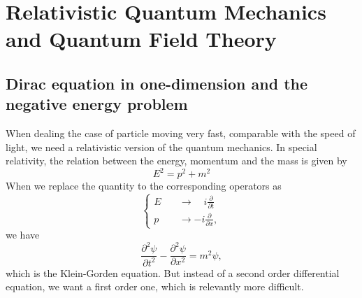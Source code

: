 \documentclass{article}
\newcommand{\be}{\begin{equation}}
\newcommand{\ee}{\end{equation}}
\newcommand{\p}{\partial}
\renewcommand{\1}{\left}
\renewcommand{\2}{\right}
\begin{document}
\newpage
\section{Relativistic Quantum Mechanics and Quantum Field Theory}
\subsection{Dirac equation in one-dimension and the negative energy problem}
When dealing the case of particle moving very fast, comparable with the speed of light, we need a relativistic version of the quantum mechanics. In special relativity, the relation between the energy, momentum and the mass is given by
\be\label{ener}
E^2=p^2+m^2
\ee
When we replace the quantity to the corresponding operators as
\be\1\{\begin{split}
E &\quad\rightarrow \quad i\frac{\p}{\p t}\\
p &\quad\rightarrow -i\frac{\p}{\p x},
\end{split}\2.\ee
we have 
\be
\frac{\p^2\psi}{\p t^2}-\frac{\p^2\psi}{\p x^2}=m^2\psi,
\ee
which is the Klein-Gorden equation. But instead of a second order differential equation, we want a first order one, which is relevantly more difficult.\\
\end{document}
